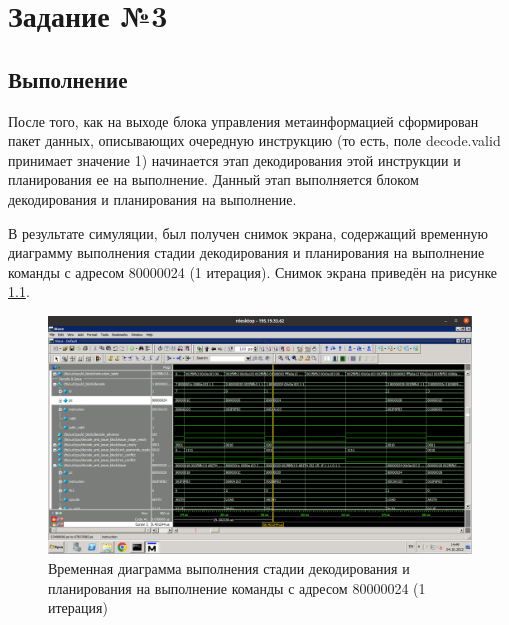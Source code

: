 \chapter{Задание №3}
\section{Выполнение}
После того, как на выходе блока управления метаинформацией сформирован пакет данных, описывающих очередную инструкцию (то есть, поле decode.valid принимает значение 1) начинается этап
декодирования этой инструкции и планирования ее на выполнение. Данный этап выполняется блоком декодирования и планирования на выполнение.

В результате симуляции, был получен снимок экрана, содержащий временную диаграмму выполнения стадии декодирования и планирования на выполнение команды с адресом 80000024 (1 итерация). Снимок экрана приведён на рисунке \ref{var4task3}.

\begin{figure}[h!p]
	\centering
	\includegraphics[width = \linewidth]{img/var4task3.png}
	\caption{Временная диаграмма выполнения стадии декодирования и планирования на выполнение команды с адресом 80000024 (1 итерация)}
	\label{var4task3}
\end{figure}

